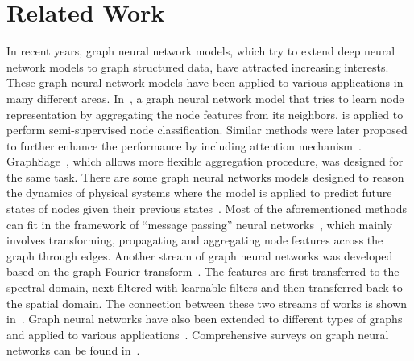 \documentclass[sigconf]{acmart}
\begin{document}
 \section{Related Work} \label{sec:related_work}

In recent years, graph neural network models, which try to extend deep neural network models to graph structured data, have attracted increasing interests. These graph neural network models have been applied to various applications in many different areas. In~\cite{kipf2016semi}, a graph neural network model that tries to learn node representation by aggregating the node features from its neighbors, is applied to perform semi-supervised node classification. Similar methods were later proposed to further enhance the performance by including attention mechanism~\cite{velivckovic2017graph}. GraphSage~\cite{ying2018hierarchical}, which allows more flexible aggregation procedure, was designed for the same task. There are some graph neural networks models designed to reason the dynamics of physical systems where the model is applied to predict future states of nodes given their previous states~\cite{battaglia2016interaction,sanchez2018graph}. Most of the aforementioned methods can fit in the framework of ``message passing'' neural networks~\cite{gilmer2017neural}, which mainly involves transforming, propagating and aggregating node features across the graph through edges. Another stream of graph neural networks was developed based on the graph Fourier transform~\cite{defferrard2016convolutional,bruna2013spectral,henaff2015deep,levie2017cayleynets}. The features are first transferred to the spectral domain,  next filtered with learnable filters and then transferred back to the spatial domain. The connection between these two streams of works is shown in~\cite{defferrard2016convolutional,kipf2016semi}. Graph neural networks have also been extended to different types of graphs~\cite{ma2018dynamic,ma2019multi,derr2018signed} and applied to various applications~\cite{wang2018zero,fan2019graph,ying2018graph,monti2017geometric,schlichtkrull2018modeling,trivedi2017know}.
Comprehensive surveys on graph neural networks can be found in~\cite{zhou2018graph,wu2019comprehensive,zhang2018deep,battaglia2018relational}.
\end{document}
